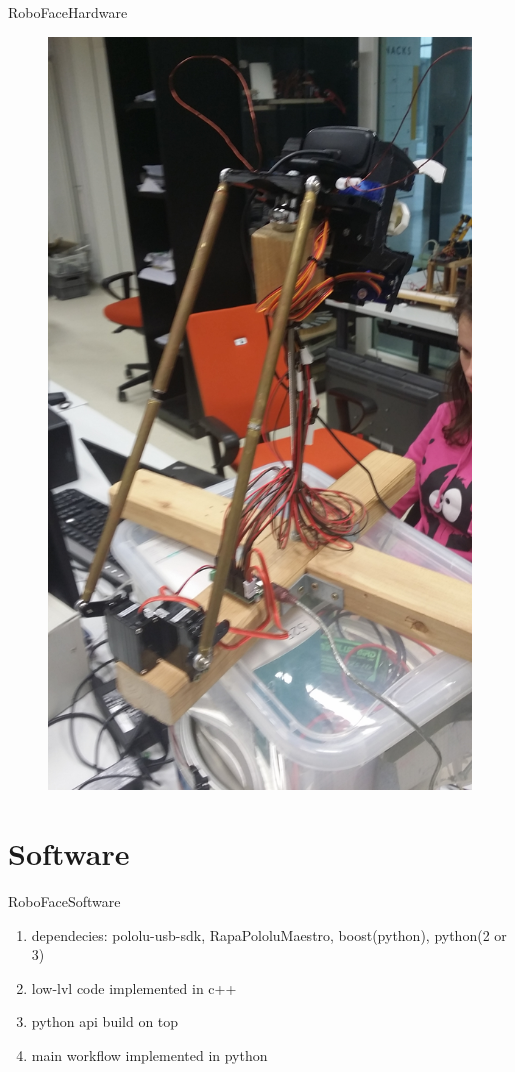 \documentclass{beamer}
\begin{document}
\begin{frame}{RoboFace}{Hardware}
	\begin{figure}
		\centering
        \includegraphics[width=\textwidth,height=\textheight,keepaspectratio]{figures/RoboFaceBack.jpg}
		\label{fig:RoboFaceBack}
	\end{figure}
\end{frame}

\section{Software}
\begin{frame}{RoboFace}{Software}
    \begin{enumerate}
        \item dependecies: pololu-usb-sdk, RapaPololuMaestro, boost(python), python(2 or 3)
        \item low-lvl code implemented in c++
        \item python api build on top
        \item main workflow implemented in python
    \end{enumerate}
\end{frame}
\end{document}

